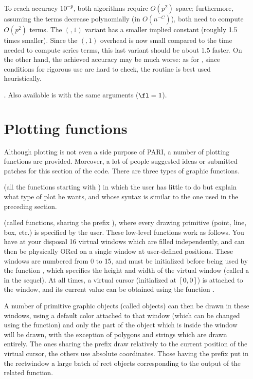 To reach accuracy $10^{-p}$, both algorithms require $O(p^2)$ space;
furthermore, assuming the terms decrease polynomially (in $O(n^{-C})$), both
need to compute $O(p^2)$ terms. The $(,1)$ variant has a smaller
implied constant (roughly 1.5 times smaller). Since the $(,1)$
overhead is now small compared to the time needed to compute series terms,
this last variant should be about 1.5 faster. On the other hand, the
achieved accuracy may be much worse: as for , since
conditions for rigorous use are hard to check, the routine is best used
heuristically.

. Also
available is  with the same arguments ($\fl = 1$).

\section{Plotting functions}

  Although plotting is not even a side purpose of PARI, a number of plotting
functions are provided. Moreover, a lot of people suggested ideas or
submitted patches for this section of the code. There are three types of
graphic functions.

 (all the functions starting with
) in which the user has little to do but explain what type of plot
he wants, and whose syntax is similar to the one used in the preceding
section.

 (called  functions,
sharing the prefix ), where every drawing primitive (point, line,
box, etc.) is specified by the user. These low-level functions work as
follows. You have at your disposal 16 virtual windows which are filled
independently, and can then be physically ORed on a single window at
user-defined positions. These windows are numbered from 0 to 15, and must be
initialized before being used by the function , which specifies
the height and width of the virtual window (called a  in the
sequel). At all times, a virtual cursor (initialized at $[0,0]$) is attached
to the window, and its current value can be obtained using the function
.

A number of primitive graphic objects (called  objects) can then
be drawn in these windows, using a default color attached to that window
(which can be changed using the  function) and only the part
of the object which is inside the window will be drawn, with the exception of
polygons and strings which are drawn entirely. The ones sharing the prefix
 draw relatively to the current position of the virtual cursor,
the others use absolute coordinates. Those having the prefix 
put in the rectwindow a large batch of rect objects corresponding to the
output of the related  function.

